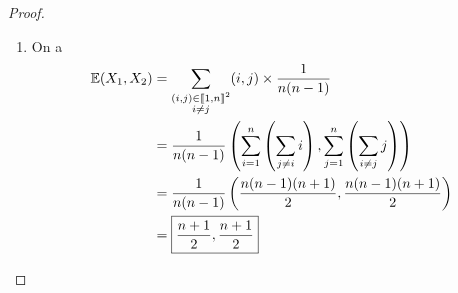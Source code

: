\documentclass[12pt]{article}
\begin{document}
\begin{proof}
\begin{enumerate}
        \item On a 
        \begin{align}
            \mathbb{E}(X_{1},X_{2})
            &=\sum_{\substack{(i,j)\in\llbracket1,n\rrbracket^{2}\\ i\neq j}}(i,j)\times\frac{1}{n(n-1)}\\
            &=\frac{1}{n(n-1)}\left(\sum_{i=1}^{n}\left(\sum_{j\neq i}i\right),\sum_{j=1}^{n}\left(\sum_{i\neq j}j\right)\right)\\
            &=\frac{1}{n(n-1)}\left(\frac{n(n-1)(n+1)}{2},\frac{n(n-1)(n+1)}{2}\right)\\
            &=\boxed{\frac{n+1}{2},\frac{n+1}{2}}
        \end{align}
    \end{enumerate}
\end{proof}
\end{document}
